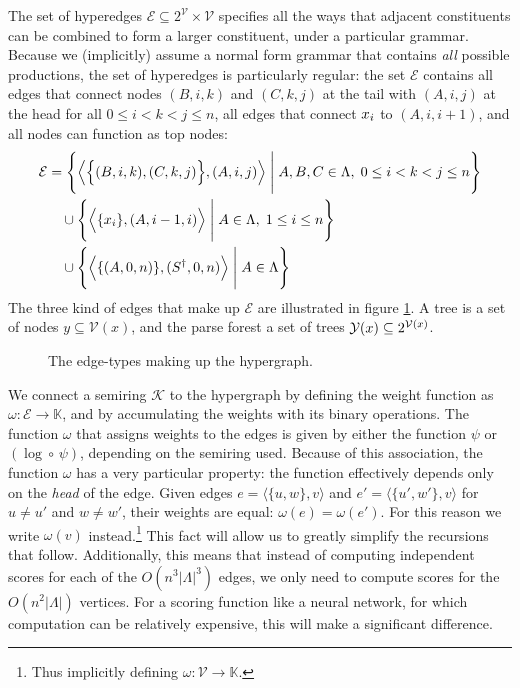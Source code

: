   The set of hyperedges $\mathcal{E} \subseteq 2^{\mathcal{V}} \times \mathcal{V}$ specifies all the ways that adjacent constituents can be combined to form a larger constituent, under a particular grammar. Because we (implicitly) assume a normal form grammar that contains \textit{all} possible productions, the set of hyperedges is particularly regular: the set $\mathcal{E}$ contains all edges that connect nodes $(B, i, k)$ and $(C, k, j)$ at the tail with $(A, i, j)$ at the head for all $0 \leq i < k < j \leq n$, all edges that connect $\x_i$ to $(A, i, i+1)$, and all nodes can function as top nodes:
  \begin{align*}
    \mathcal{E}
      &= \Bigg\{ \Big\langle \Big\{ (B, i, k), (C, k, j) \Big\},  (A, i, j) \Big\rangle \; \Bigg\vert \; A, B, C \in \Lambda, \; 0 \leq i < k < j \leq n \Bigg\}  \\
      &\quad\cup \Bigg\{ \Big\langle \{ \x_i \}, (A, i-1, i) \Big\rangle \; \Bigg\vert \; A \in \Lambda, \; 1 \leq i \leq n \Bigg\}  \\
      &\quad\cup \Bigg\{ \Big\langle \{ (A, 0, n) \}, (S^{\dagger}, 0, n) \Big\rangle \; \Bigg\vert \; A \in \Lambda \Bigg\}
  \end{align*}
  The three kind of edges that make up $\mathcal{E}$ are illustrated in figure \ref{fig:crf-edges}. A tree is a set of nodes $y \subseteq \mathcal{V}(x)$, and the parse forest a set of trees $\yieldx \subseteq 2^{\mathcal{V}(x)}$.

  \begin{figure}[h]
    \center
    \begin{tikzpicture}[scale=.6]
      
    \end{tikzpicture}
    \caption{The edge-types making up the hypergraph.}
    \label{fig:crf-edges}
  \end{figure}

  We connect a semiring $\mathcal{K}$ to the hypergraph by defining the weight function as $\omega: \mathcal{E} \to \mathbb{K}$, and by accumulating the weights with its binary operations. The function $\omega$ that assigns weights to the edges is given by either the function $\psi$ or $(\log \circ \, \psi)$, depending on the semiring used. Because of this association, the function $\omega$ has a very particular property: the function effectively depends only on the \textit{head} of the edge. Given edges $e = \langle \{ u, w \}, v \rangle$ and $e' =  \langle \{ u', w' \}, v \rangle$ for $u \neq u'$ and $w \neq w'$, their weights are equal: $\omega(e) = \omega(e')$. For this reason we write $\omega(v)$ instead.\footnote{Thus implicitly defining $\omega: \mathcal{V} \to \mathbb{K}$.} This fact will allow us to greatly simplify the recursions that follow. Additionally, this means that instead of computing independent scores for each of the $O(n^3 \vert\Lambda\rvert^3)$ edges, we only need to compute scores for the $O(n^2 \vert\Lambda\rvert)$ vertices. For a scoring function like a neural network, for which computation can be relatively expensive, this will make a significant difference.

